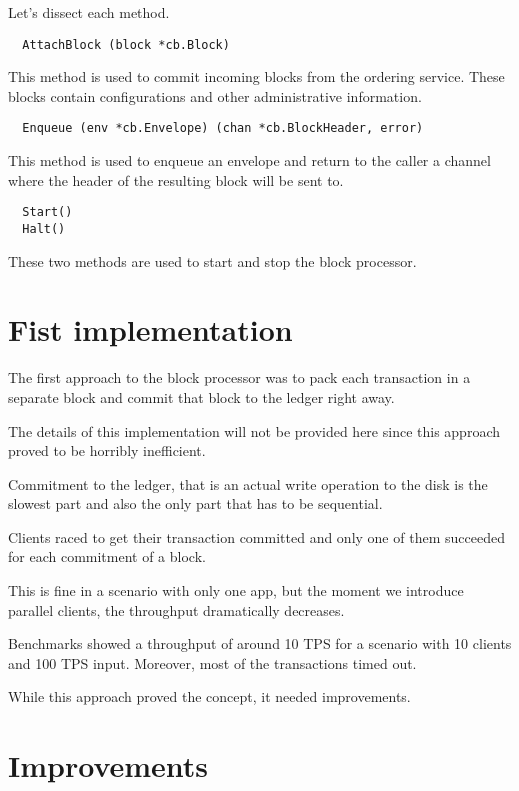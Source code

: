 Let's dissect each method.

\begin{lstlisting}
  AttachBlock (block *cb.Block)
\end{lstlisting}

This method is used to commit incoming blocks from the ordering service. These blocks contain configurations and other administrative information.

\begin{lstlisting}
  Enqueue (env *cb.Envelope) (chan *cb.BlockHeader, error)
\end{lstlisting}

This method is used to enqueue an envelope and return to the caller a channel where the header of the resulting block will be sent to.

\begin{lstlisting}
  Start()
  Halt()
\end{lstlisting}

These two methods are used to start and stop the block processor.

\section{Fist implementation}

The first approach to the block processor was to pack each transaction in a separate block and commit that block to the ledger right away.

The details of this implementation will not be provided here since this approach proved to be horribly inefficient.

Commitment to the ledger, that is an actual write operation to the disk is the slowest part and also the only part that has to be sequential.

Clients raced to get their transaction committed and only one of them succeeded for each commitment of a block.

This is fine in a scenario with only one app, but the moment we introduce parallel clients, the throughput dramatically decreases.

Benchmarks showed a throughput of around 10 TPS for a scenario with 10 clients and 100 TPS input. Moreover, most of the transactions timed out.

While this approach proved the concept, it needed improvements.

\section{Improvements}
\label{sec:bp-impr}

